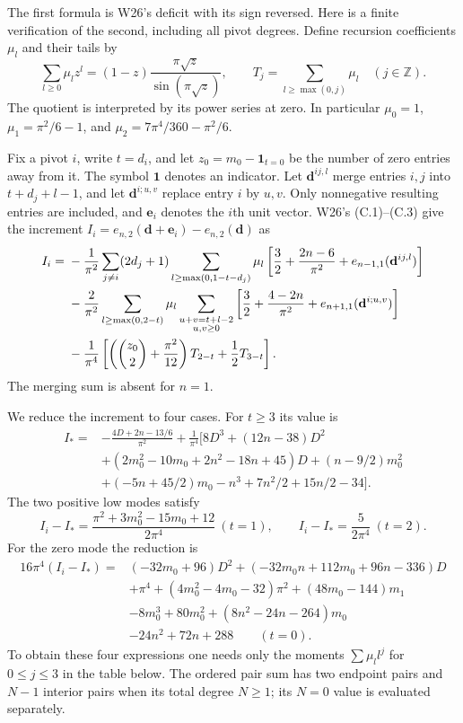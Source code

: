 \begin{prf}
The first formula is W26's deficit with its sign reversed. Here is a
finite verification of the second, including all pivot degrees. Define
recursion coefficients $\mu_l$ and their tails by
\begin{equation}\label{eq:a:recursion-kernel}
 \sum_{l\geq0}\mu_l z^l
 =(1-z)\frac{\pi\sqrt z}{\sin(\pi\sqrt z)},\qquad
 T_j=\sum_{l\geq\max(0,j)}\mu_l\quad(j\in\mathbb Z).
\end{equation}
The quotient is interpreted by its power series at zero. In particular
$\mu_0=1$, $\mu_1=\pi^2/6-1$, and
$\mu_2=7\pi^4/360-\pi^2/6$.

Fix a pivot $i$, write $t=d_i$, and let $z_0=m_0-\mathbf1_{t=0}$ be
the number of zero entries away from it. The symbol $\mathbf1$ denotes
an indicator. Let $\mathbf d^{ij,l}$ merge entries $i,j$ into
$t+d_j+l-1$, and let $\mathbf d^{i;u,v}$ replace entry $i$ by $u,v$.
Only nonnegative resulting entries are included, and $\mathbf e_i$
denotes the $i$th unit vector. W26's (C.1)--(C.3)
give the increment $I_i=e_{n,2}(\mathbf d+\mathbf e_i)-e_{n,2}(\mathbf d)$
as
\begin{align}
 I_i={}&-\frac1{\pi^2}\sum_{j\ne i}(2d_j+1)
  \sum_{l\geq\max(0,1-t-d_j)}\mu_l
  \left[\frac32+\frac{2n-6}{\pi^2}
                 +e_{n-1,1}(\mathbf d^{ij,l})\right]\notag\\
 &-\frac2{\pi^2}\sum_{l\geq\max(0,2-t)}\mu_l
  \sum_{\substack{u+v=t+l-2\\u,v\geq0}}
  \left[\frac32+\frac{4-2n}{\pi^2}
                 +e_{n+1,1}(\mathbf d^{i;u,v})\right]\notag\\
 &-\frac1{\pi^4}
 \left[\left(\binom{z_0}{2}+\frac{\pi^2}{12}\right)T_{2-t}
                                      +\frac12 T_{3-t}\right].
 \label{eq:a:second-increment}
\end{align}
The merging sum is absent for $n=1$.

We reduce the increment to four cases. For $t\geq3$ its value is
\begin{align*}
 I_*={}&-\frac{4D+2n-13/6}{\pi^2}+\frac1{\pi^4}
 \bigl[8D^3+(12n-38)D^2\\
 &+(2m_0^2-10m_0+2n^2-18n+45)D
 +(n-9/2)m_0^2\\
 &+(-5n+45/2)m_0-n^3+7n^2/2+15n/2-34\bigr].
\end{align*}
The two positive low modes satisfy
\[
 I_i-I_*=\frac{\pi^2+3m_0^2-15m_0+12}{2\pi^4}\ (t=1),\qquad
 I_i-I_*=\frac5{2\pi^4}\ (t=2).
\]
For the zero mode the reduction is
\begin{align*}
 16\pi^4(I_i-I_*)={}&(-32m_0+96)D^2
 +(-32m_0n+112m_0+96n-336)D\\
 &+\pi^4+(4m_0^2-4m_0-32)\pi^2
 +(48m_0-144)m_1\\
 &-8m_0^3+80m_0^2+(8n^2-24n-264)m_0\\
 &-24n^2+72n+288\qquad(t=0).
\end{align*}
To obtain these four expressions one needs only the moments
$\sum\mu_l l^j$ for $0\leq j\leq3$ in the table below. The ordered
pair sum has two endpoint pairs and $N-1$ interior pairs when its total
degree $N\geq1$; its $N=0$ value is evaluated separately.


\end{prf}
